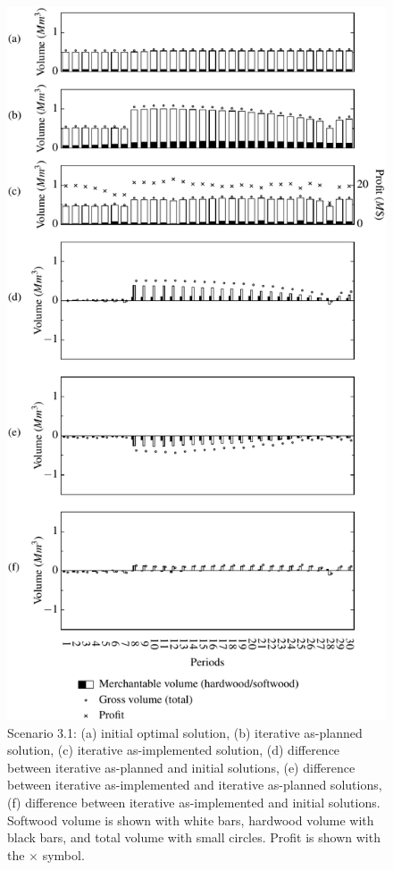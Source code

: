 \begin{figure}[ht!]
  \caption{Scenario 3.1: (a) initial optimal solution, (b) iterative
    as-planned solution, (c) iterative as-implemented solution, (d)
    difference between iterative as-planned and initial solutions, (e)
    difference between iterative as-implemented and iterative
    as-planned solutions, (f) difference between iterative
    as-implemented and initial solutions. Softwood volume is shown
    with white bars, hardwood volume with black bars, and total volume
    with small circles. Profit is shown with the
    $\times$ symbol.}
  \label{fig:scenario3.1}
  \medskip
  \centering
  \includegraphics[width=0.65\columnwidth]{images/s3-1}
\end{figure}

